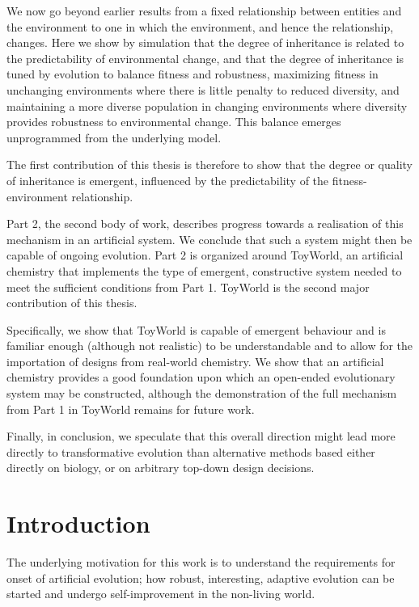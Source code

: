 \documentclass[]{report}
\begin{document}
{We now go beyond earlier results from a fixed relationship between entities and the environment to one in which the environment, and hence the relationship, changes. Here we show by simulation that the degree of inheritance is related to the predictability of environmental change, and that the degree of inheritance is tuned by evolution to balance fitness and robustness, maximizing fitness in unchanging environments where there is little penalty to reduced diversity, and maintaining a more diverse population in changing environments where diversity provides robustness to environmental change. This balance emerges unprogrammed from the underlying model.

The first contribution of this thesis is therefore to show that the degree or quality of inheritance is emergent, influenced by the predictability of the fitness-environment relationship. 

Part 2, the second body of work, describes progress towards a realisation of this mechanism in an artificial system. We conclude that such a system might then be capable of ongoing evolution. Part 2 is organized around ToyWorld, an artificial chemistry that implements the type of emergent, constructive system needed to meet the sufficient conditions from Part 1. ToyWorld is the second major contribution of this thesis.

Specifically, we show that ToyWorld is capable of emergent behaviour and is familiar enough (although not realistic) to be understandable and to allow for the importation of designs from real-world chemistry. We show that an artificial chemistry provides a good foundation upon which an open-ended evolutionary system may be constructed, although the demonstration of the full mechanism from Part 1 in ToyWorld remains for future work.

Finally, in conclusion, we speculate that this overall direction might lead more directly to transformative evolution than alternative methods based either directly on biology, or on arbitrary top-down design decisions.}

\clearpage
\chapter{Introduction}

The underlying motivation for this work is to understand the requirements for onset of artificial evolution; how robust, interesting, adaptive evolution can be started and undergo self-improvement in the non-living world.
\end{document}
